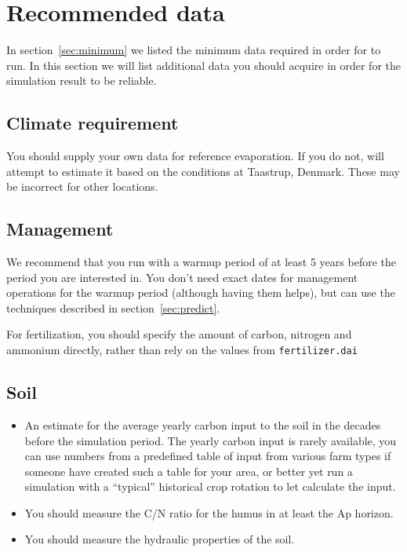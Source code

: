 \documentclass[a4paper,11pt,twoside]{article}
\begin{document}
\section{Recommended data}
\label{sec:recommended}

In section~\ref{sec:minimum} we listed the minimum data required in
order for \daisy{} to run.  In this section we will list additional
data you should acquire in order for the simulation result to be
reliable.

\subsection{Climate requirement}

You should supply your own data for reference evaporation.  If you do
not, \daisy{} will attempt to estimate it based on the conditions at
Taastrup, Denmark.  These may be incorrect for other locations.

\subsection{Management}
\label{sec:warmup}

We recommend that you run with a warmup period of at least 5 years
before the period you are interested in.  You don't need exact dates
for management operations for the warmup period (although having them
helps), but can use the techniques described in
section~\ref{sec:predict}.

For fertilization, you should specify the amount of carbon, nitrogen
and ammonium directly, rather than rely on the values from
\texttt{fertilizer.dai}

\subsection{Soil}

\begin{itemize}
\item An estimate for the average yearly carbon input to the soil in
  the decades before the simulation period.  The yearly carbon input
  is rarely available, you can use numbers from a predefined table of
  input from various farm types if someone have created such a table
  for your area, or better yet run a simulation with a ``typical''
  historical crop rotation to let \daisy{} calculate the input.
\item You should measure the C/N ratio for the humus in at least the
  Ap horizon.
\item You should measure the hydraulic properties of the soil.
\end{itemize}
\end{document}
